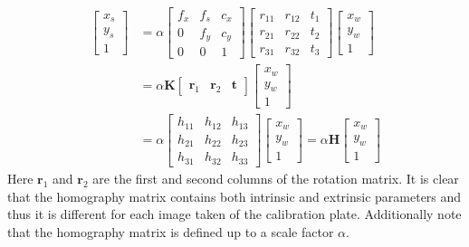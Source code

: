 \documentclass[12pt,oneside,openany,a4paper, %
english, %
masters-t, goldenblock]{usthesis}
\begin{document}
\begin{align}
  \begin{bmatrix}
  x_s \\
  y_s \\
  1
  \end{bmatrix} &=
  \alpha
  \begin{bmatrix}
  f_x & f_s & c_x \\
  0 & f_y & c_y \\
  0 & 0 & 1 
  \end{bmatrix}
  \begin{bmatrix}
  r_{11} & r_{12} & t_1 \\
  r_{21} & r_{22} & t_2 \\
  r_{31} & r_{32} & t_3 
  \end{bmatrix}
  \begin{bmatrix}
  x_w \\
  y_w \\
  1
  \end{bmatrix} \\
  &= \alpha \bm{K} 
  \begin{bmatrix}
  \bm{r}_1 & \bm{r}_2 & \bm{t}
  \end{bmatrix}
  \begin{bmatrix}
  x_w \\
  y_w \\
  1
  \end{bmatrix} \\
  &= \alpha
  \begin{bmatrix}
  h_{11} & h_{12} & h_{13} \\
  h_{21} & h_{22} & h_{23} \\
  h_{31} & h_{32} & h_{33}
  \end{bmatrix} 
  \begin{bmatrix}
  x_w \\
  y_w \\
  1
  \end{bmatrix}
  =\alpha \bm{H} 
  \begin{bmatrix}
  x_w \\
  y_w \\
  1
  \end{bmatrix} \label{eq: homography 1}
\end{align}
Here $\bm{r}_1$ and $\bm{r}_2$ are the first and second columns of the rotation matrix. It is clear that the homography matrix contains both intrinsic and extrinsic parameters and thus it is different for each image taken of the calibration plate. Additionally note that the homography matrix is defined up to a scale factor $\alpha$.
\end{document}
